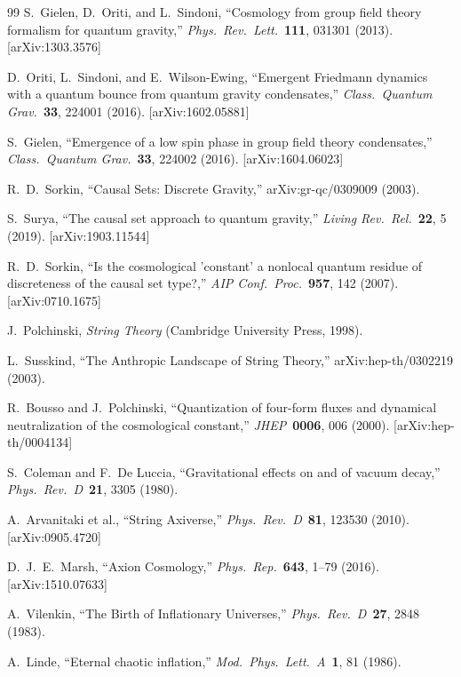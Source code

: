 \documentclass[11pt,a4paper]{article}
\theoremstyle{definition}
\theoremstyle{remark}
\begin{document}
\begin{thebibliography}{99}
S.~Gielen, D.~Oriti, and L.~Sindoni, ``Cosmology from group field theory formalism for quantum gravity,'' \emph{Phys.\ Rev.\ Lett.}\ \textbf{111}, 031301 (2013). [arXiv:1303.3576]

D.~Oriti, L.~Sindoni, and E.~Wilson-Ewing, ``Emergent Friedmann dynamics with a quantum bounce from quantum gravity condensates,'' \emph{Class.\ Quantum Grav.}\ \textbf{33}, 224001 (2016). [arXiv:1602.05881]

S.~Gielen, ``Emergence of a low spin phase in group field theory condensates,'' \emph{Class.\ Quantum Grav.}\ \textbf{33}, 224002 (2016). [arXiv:1604.06023]

R.~D.~Sorkin, ``Causal Sets: Discrete Gravity,'' arXiv:gr-qc/0309009 (2003).

S.~Surya, ``The causal set approach to quantum gravity,'' \emph{Living Rev.\ Rel.}\ \textbf{22}, 5 (2019). [arXiv:1903.11544]

R.~D.~Sorkin, ``Is the cosmological 'constant' a nonlocal quantum residue of discreteness of the causal set type?,'' \emph{AIP Conf.\ Proc.}\ \textbf{957}, 142 (2007). [arXiv:0710.1675]

J.~Polchinski, \emph{String Theory} (Cambridge University Press, 1998).

L.~Susskind, ``The Anthropic Landscape of String Theory,'' arXiv:hep-th/0302219 (2003).

R.~Bousso and J.~Polchinski, ``Quantization of four-form fluxes and dynamical neutralization of the cosmological constant,'' \emph{JHEP}\ \textbf{0006}, 006 (2000). [arXiv:hep-th/0004134]

S.~Coleman and F.~De Luccia, ``Gravitational effects on and of vacuum decay,'' \emph{Phys.\ Rev.\ D}\ \textbf{21}, 3305 (1980).

A.~Arvanitaki et al., ``String Axiverse,'' \emph{Phys.\ Rev.\ D}\ \textbf{81}, 123530 (2010). [arXiv:0905.4720]

D.~J.~E.~Marsh, ``Axion Cosmology,'' \emph{Phys.\ Rep.}\ \textbf{643}, 1--79 (2016). [arXiv:1510.07633]

A.~Vilenkin, ``The Birth of Inflationary Universes,'' \emph{Phys.\ Rev.\ D}\ \textbf{27}, 2848 (1983).

A.~Linde, ``Eternal chaotic inflation,'' \emph{Mod.\ Phys.\ Lett.\ A}\ \textbf{1}, 81 (1986).


\end{thebibliography}
\end{document}
